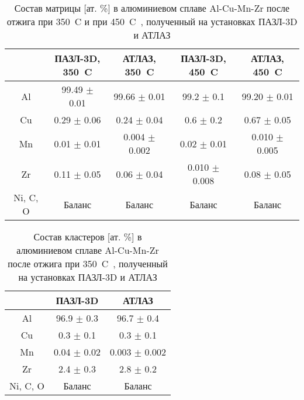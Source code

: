 \begin{table} [htbp]
	\centering
	\caption{Состав матрицы [ат. \%] в алюминиевом сплаве Al-Cu-Mn-Zr после отжига при 350~\textdegree C и при 450~\textdegree C~\cite{scbibAPPLEvsATLAS}, полученный на установках ПАЗЛ-3D и АТЛАЗ}
	\label{tab:matrixAPPLEvsATLAS}
	\begin{SingleSpace}
		\begin{tabular} {| c | c | c | c | c |}
			\hline
			{} & \thead{ПАЗЛ-3D, \\ 350~\textdegree C} & \thead{АТЛАЗ, \\ 350~\textdegree C} & \thead{ПАЗЛ-3D, \\ 450~\textdegree C} & \thead{АТЛАЗ, \\ 450~\textdegree C} \\ \hline
			Al       & 99.49 $\pm$ 0.01  & 99.66 $\pm$ 0.01 & 99.2 $\pm$ 0.1  & 99.20 $\pm$ 0.01  \\ \hline
			Cu       & 0.29 $\pm$ 0.06   & 0.24 $\pm$ 0.04  & 0.6 $\pm$ 0.2  & 0.67 $\pm$ 0.05  \\ \hline
			Mn       & 0.01 $\pm$ 0.01 & 0.004 $\pm$ 0.002 & 0.02 $\pm$ 0.01  & 0.010 $\pm$ 0.005 \\ \hline
			Zr       & 0.11 $\pm$ 0.05   & 0.06 $\pm$ 0.04 & 0.010 $\pm$ 0.008  & 
			0.08 $\pm$ 0.05   \\ \hline
			Ni, C, O & Баланс & Баланс & Баланс & Баланс  \\ \hline			
		\end{tabular}
	\end{SingleSpace}
\end{table}

\begin{table} [htbp]
	\centering
	\caption{Состав кластеров [ат. \%] в алюминиевом сплаве Al-Cu-Mn-Zr после отжига при 350~\textdegree C~\cite{scbibAPPLEvsATLAS}, полученный на установках ПАЗЛ-3D и АТЛАЗ}
	\label{tab:clustersAPPLEvsATLAS}
	\begin{SingleSpace}
		\begin{tabular} {| c | c | c |}
			\hline
			{} & ПАЗЛ-3D & АТЛАЗ \\ \hline
			Al       & 96.9 $\pm$ 0.3  & 96.7 $\pm$ 0.4   \\ \hline
			Cu       & 0.3 $\pm$ 0.1   & 0.3 $\pm$ 0.1    \\ \hline
			Mn       & 0.04 $\pm$ 0.02 & 0.003 $\pm$ 0.002  \\ \hline
			Zr       & 2.4 $\pm$ 0.3   & 2.8 $\pm$ 0.2    \\ \hline
			Ni, C, O & Баланс & Баланс   \\ \hline			
		\end{tabular}
	\end{SingleSpace}
\end{table}

